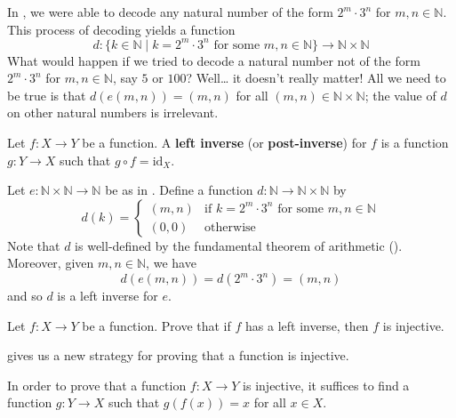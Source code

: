 In , we were able to decode any natural number of the form $2^m \cdot 3^n$ for $m,n \in \mathbb{N}$. This process of decoding yields a function
\[ d : \{ k \in \mathbb{N} \mid k=2^m \cdot 3^n \text{ for some } m,n \in \mathbb{N} \} \to \mathbb{N} \times \mathbb{N} \]
What would happen if we tried to decode a natural number not of the form $2^m \cdot 3^n$ for $m,n \in \mathbb{N}$, say $5$ or $100$? Well\dots{} it doesn't really matter! All we need to be true is that $d(e(m,n))=(m,n)$ for all $(m,n) \in \mathbb{N} \times \mathbb{N}$; the value of $d$ on other natural numbers is irrelevant.

\begin{definition}
\label{defLeftInverse}
Let $f : X \to Y$ be a function. A \textbf{left inverse} (or \textbf{post-inverse}) for $f$ is a function $g : Y \to X$ such that $g \circ f = \mathrm{id}_X$.
\end{definition}

\begin{example}
Let $e : \mathbb{N} \times \mathbb{N} \to \mathbb{N}$ be as in . Define a function $d : \mathbb{N} \to \mathbb{N} \times \mathbb{N}$ by
\[ d(k) = \begin{cases}
(m,n) & \text{if } k=2^m \cdot 3^n \text{ for some } m,n \in \mathbb{N} \\
(0,0) & \text{otherwise}
\end{cases} \]
Note that $d$ is well-defined by the fundamental theorem of arithmetic (). Moreover, given $m,n \in \mathbb{N}$, we have
\[ d(e(m,n)) = d(2^m \cdot 3^n) = (m,n) \]
and so $d$ is a left inverse for $e$.
\end{example}

\begin{exercise}
\label{exIfHasLeftInverseThenInjective}
Let $f : X \to Y$ be a function. Prove that if $f$ has a left inverse, then $f$ is injective.
\end{exercise}

 gives us a new strategy for proving that a function is injective.

\begin{strategy}
In order to prove that a function $f : X \to Y$ is injective, it suffices to find a function $g : Y \to X$ such that $g(f(x)) = x$ for all $x \in X$.
\end{strategy}

